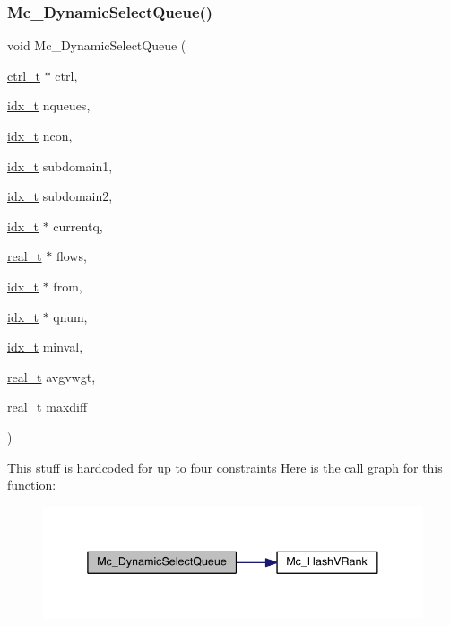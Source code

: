 \subsubsection{\texorpdfstring{Mc\+\_\+\+Dynamic\+Select\+Queue()}{Mc\_DynamicSelectQueue()}}
{\footnotesize\ttfamily void Mc\+\_\+\+Dynamic\+Select\+Queue (\begin{DoxyParamCaption}\item[{\hyperlink{a00742}{ctrl\+\_\+t} $\ast$}]{ctrl,  }\item[{\hyperlink{a00876_aaa5262be3e700770163401acb0150f52}{idx\+\_\+t}}]{nqueues,  }\item[{\hyperlink{a00876_aaa5262be3e700770163401acb0150f52}{idx\+\_\+t}}]{ncon,  }\item[{\hyperlink{a00876_aaa5262be3e700770163401acb0150f52}{idx\+\_\+t}}]{subdomain1,  }\item[{\hyperlink{a00876_aaa5262be3e700770163401acb0150f52}{idx\+\_\+t}}]{subdomain2,  }\item[{\hyperlink{a00876_aaa5262be3e700770163401acb0150f52}{idx\+\_\+t} $\ast$}]{currentq,  }\item[{\hyperlink{a00876_a1924a4f6907cc3833213aba1f07fcbe9}{real\+\_\+t} $\ast$}]{flows,  }\item[{\hyperlink{a00876_aaa5262be3e700770163401acb0150f52}{idx\+\_\+t} $\ast$}]{from,  }\item[{\hyperlink{a00876_aaa5262be3e700770163401acb0150f52}{idx\+\_\+t} $\ast$}]{qnum,  }\item[{\hyperlink{a00876_aaa5262be3e700770163401acb0150f52}{idx\+\_\+t}}]{minval,  }\item[{\hyperlink{a00876_a1924a4f6907cc3833213aba1f07fcbe9}{real\+\_\+t}}]{avgvwgt,  }\item[{\hyperlink{a00876_a1924a4f6907cc3833213aba1f07fcbe9}{real\+\_\+t}}]{maxdiff }\end{DoxyParamCaption})}

This stuff is hardcoded for up to four constraints Here is the call graph for this function\+:\nopagebreak
\begin{figure}[H]
\begin{center}
\leavevmode
\includegraphics[width=338pt]{a00951_aeeb2d9296e2305bdf67b62ba868ad55b_cgraph}
\end{center}
\end{figure}
\mbox{\label{a00951_a626dd91f1c7a272128a4e825fa72cf18}} 

